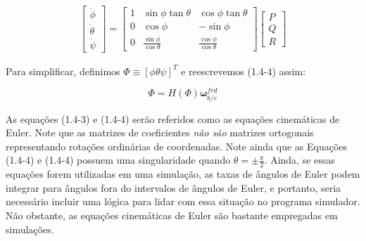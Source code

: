 \begin{align} \tag{1.4-4}
    \begin{bmatrix}
        \dot\phi \\
        \dot\theta \\
        \dot\psi
    \end{bmatrix}
    =
    \begin{bmatrix}
        1 & \sin{\phi}\tan{\theta} & \cos{\phi}\tan{\theta} \\
        0 & \cos{\phi} & -\sin{\phi} \\
        0 & \frac{\sin{\phi}}{\cos{\theta}} & \frac{\cos{\phi}}{\cos{\theta}}
    \end{bmatrix}
    \begin{bmatrix}
        P \\ Q \\ R
    \end{bmatrix}
\end{align}

Para simplificar, definimos \(\Phi \equiv \left[\phi \theta \psi \right]^T \) e reescrevemos  (1.4-4) assim:

\begin{equation} \tag{1.4-5}
    \Phi = H \left( \Phi \right) \mathbf{\omega}^{frd}_{b/r}
\end{equation}

As equações (1.4-3) e (1.4-4) serão referidos como as equações cinemáticas de
Euler. Note que as matrizes de coeficientes \emph{não são} matrizes ortogonais
representando rotações ordinárias de coordenadas. Note ainda que as Equações
(1.4-4) e (1.4-4) possuem uma singularidade quando  \(\theta = \pm
\frac{\pi}{2}\). Ainda, se essas equações forem utilizadas em uma simulação, as
taxas de ângulos de Euler podem integrar para ângulos fora do intervalos de
ângulos de Euler, e portanto, seria necessário incluir uma lógica para lidar
com essa situação no programa simulador. Não obstante, as equações cinemáticas
de Euler são bastante empregadas em simulações.

